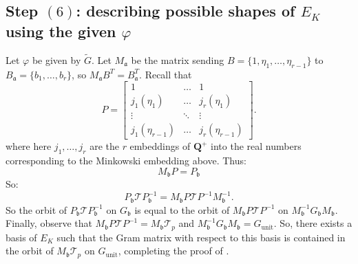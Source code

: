 \documentclass{amsart}
\newcommand{\QQ}{\mathbf{Q}}
\DeclareMathOperator{\unit}{unit}
\numberwithin{equation}{section}
\begin{document}
\subsection{Step $(6)$: describing possible shapes of $E_K$ using the given $\varphi$}
Let $\varphi$ be given by $\widetilde{G}$. Let $M_{\mathfrak{a}}$ be the matrix sending $B = \{1,\eta_1,\dots,\eta_{r-1}\}$ to $B_{\mathfrak{a}} = \{b_1,\dots,b_r\}$, so $M_{\mathfrak{a}}B^T = B_{\mathfrak{a}}^T$. Recall that
\[
    P = 
\begin{bmatrix}
    1       & \dots & 1 \\
    j_1(\eta_1)       & \dots & j_r(\eta_1) \\
    \vdots &  \ddots & \vdots \\
    j_1(\eta_{r-1})       & \dots & j_r(\eta_{r-1})
\end{bmatrix}.
\]
where here $j_1,\dots,j_r$ are the $r$ embeddings of $\QQ^+$ into the real numbers corresponding to the Minkowski embedding above. Thus:
\[
    M_{\mathfrak{b}}P = P_{\mathfrak{b}}
\]
So:
\[
    P_{\mathfrak{b}}\mathcal{T}P_{\mathfrak{b}}^{-1} = M_{\mathfrak{b}}P\mathcal{T}P^{-1}M_{\mathfrak{b}}^{-1}.
\]
So the orbit of $P_{\mathfrak{b}}\mathcal{T}P_{\mathfrak{b}}^{-1}$ on $G_{\mathfrak{b}}$ is equal to the orbit of $M_{\mathfrak{b}}P\mathcal{T}P^{-1}$ on $M_{\mathfrak{b}}^{-1}G_{\mathfrak{b}}M_{\mathfrak{b}}$. Finally, observe that $M_{\mathfrak{b}}P\mathcal{T}P^{-1} = M_{\mathfrak{b}}\mathcal{T}_p$ and $M_{\mathfrak{b}}^{-1}G_{\mathfrak{b}}M_{\mathfrak{b}} = G_{\unit}$. So, there exists a basis of $E_K$ such that the Gram matrix with respect to this basis is contained in the orbit of $M_{\mathfrak{b}}\mathcal{T}_p$ on $G_{\unit}$, completing the proof of . 
\end{document}
